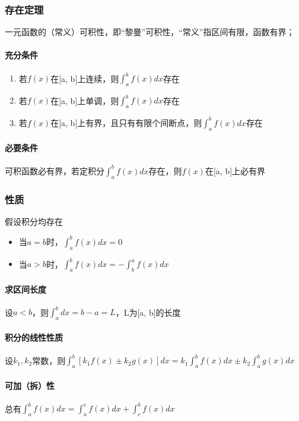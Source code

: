 \subsubsection{存在定理}
一元函数的（常义）可积性，即“黎曼”可积性，“常义”指区间有限，函数有界；

\paragraph{充分条件}
\begin{enumerate}
    \item 若\(f(x)\)在[a, b]上连续，则\(\displaystyle\int_a^bf(x)dx\)存在
    \item 若\(f(x)\)在[a, b]上单调，则\(\displaystyle\int_a^bf(x)dx\)存在
    \item 若\(f(x)\)在[a, b]上有界，且只有有限个间断点，则\(\displaystyle\int_a^bf(x)dx\)存在
\end{enumerate}

\paragraph{必要条件}
可积函数必有界，若定积分\(\displaystyle\int_a^bf(x)dx\)存在，则\(f(x)\)在[a, b]上必有界

\subsubsection{性质}
假设积分均存在
\begin{itemize}
    \item 当\(a = b\)时，\(\displaystyle\int_a^bf(x)dx = 0\)
    \item 当\(a > b\)时，\(\displaystyle\int_a^bf(x)dx = -\int_b^af(x)dx\)
\end{itemize}

\paragraph{求区间长度}
设\(a < b\)，则\(\displaystyle\int_a^bdx = b - a = L\)，L为[a, b]的长度

\paragraph{积分的线性性质}
设\(k_1, k_2\)常数，则\(\displaystyle\int_a^b[k_1f(x) \pm k_2g(x)]dx = k_1\int_a^bf(x)dx \pm k_2\int_a^bg(x)dx\)

\paragraph{可加（拆）性}
总有\(\displaystyle \int_a^bf(x)dx = \int_a^cf(x)dx + \int_c^bf(x)dx\)

